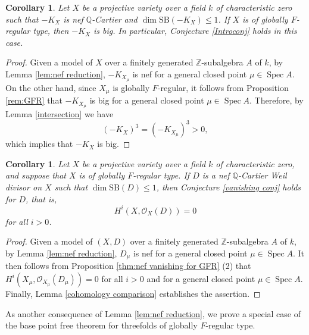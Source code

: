 \documentclass[12pt]{amsart}
\def\Spec{\operatorname{Spec}}
\newcommand{\Q}{\mathbb{Q}}
\newcommand{\Z}{\mathbb{Z}}
\newcommand{\sO}{\mathcal{O}}
\theoremstyle{plain}
\newtheorem{cor}[thm]{Corollary}
\theoremstyle{definition}
\theoremstyle{remark}
\newtheorem{defn and notation}[thm]{Definition and Notation}
\theoremstyle{plain}
\begin{document}
\begin{cor}\label{cor:big}
Let $X$ be a projective variety over a field $k$ of characteristic zero such that $-K_X$ is nef $\Q$-Cartier and $\dim \mathrm{SB}(-K_X)\leq 1$. 
If $X$ is of globally $F$-regular type, 
then $-K_X$ is big. In particular, Conjecture \ref{Introconj} holds in this case.
\end{cor}
\begin{proof}
Given a model of $X$ over a finitely generated $\Z$-subalgebra $A$ of $k$, by Lemma \ref{lem:nef reduction}, $-K_{X_{\mu}}$ is nef for a general closed point $\mu \in \Spec A$. 
On the other hand, since $X_{\mu}$ is globally $F$-regular, it follows from Proposition \ref{rem:GFR} that $-K_{X_{\mu}}$ is big for a general closed point $\mu \in \Spec A$. 
Therefore, by Lemma \ref{intersection} we have 
\[(-K_{X})^3=(-K_{X_{\mu}})^3>0,\] 
which implies that $-K_X$ is big.
\end{proof}


\begin{cor}\label{cor:nef vanishing}
Let $X$ be a projective variety over a field $k$ of characteristic zero, and suppose that $X$ is of globally $F$-regular type.
If $D$ is a nef $\Q$-Cartier Weil divisor on $X$ such that $\dim \mathrm{SB}(D)\leq 1$, then Conjecture \ref{vanishing conj} holds for $D$, that is, 
\[
H^i(X,\sO_X(D))=0
\]
for all $i>0$. 
\end{cor}
\begin{proof}
Given a model of $(X, D)$ over a finitely generated $\Z$-subalgebra $A$ of $k$, by Lemma \ref{lem:nef reduction}, $D_{\mu}$ is nef for a general closed point $\mu \in \Spec A$. 
It then follows from Proposition \ref{thm:nef vanishing for GFR} (2) that $H^i(X_{\mu},\sO_{X_{\mu}}(D_{\mu}))=0$ for all $i>0$ and for a general closed point $\mu \in \Spec A$. 
Finally, Lemma \ref{cohomology comparison} establishes the assertion. 
\end{proof}

As another consequence of Lemma \ref{lem:nef reduction}, we prove a special case of the base point free theorem for threefolds of globally $F$-regular type. 
\end{document}

